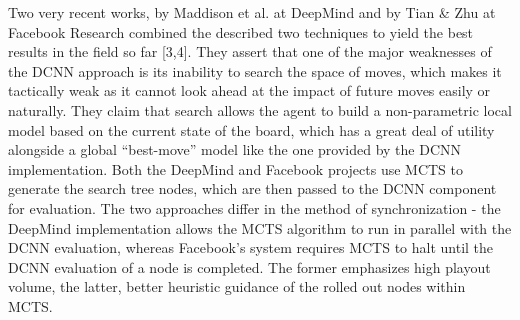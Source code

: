 Two very recent works, by Maddison et al. at DeepMind and by Tian \& Zhu at Facebook Research combined the described two techniques to yield the best results in the field so far [3,4]. They assert that one of the major weaknesses of the DCNN approach is its inability to search the space of moves, which makes it tactically weak as it cannot look ahead at the impact of future moves easily or naturally. They claim that search allows the agent to build a non-parametric local model based on the current state of the board, which has a great deal of utility alongside a global ``best-move'' model like the one provided by the DCNN implementation. Both the DeepMind and Facebook projects use MCTS to generate the search tree nodes, which are then passed to the DCNN component for evaluation. The two approaches differ in the method of synchronization - the DeepMind implementation allows the MCTS algorithm to run in parallel with the DCNN evaluation, whereas Facebook's system requires MCTS to halt until the DCNN evaluation of a node is completed. The former emphasizes high playout volume, the latter, better heuristic guidance of the rolled out nodes within MCTS. 
